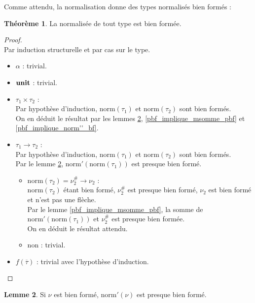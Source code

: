 \documentclass[a4paper]{report}
\newenvironment{preuve} 
	{\begin{proof}~\\} 
	{\end{proof}}
\theoremstyle{definition}
\newtheorem{theoreme}{Théorème}
\newtheorem{lemme}[theoreme]{Lemme}
\newcommand{\unit}{\bold{unit}}
\newcommand{\norm}{\mathrm{norm}}
\begin{document}
Comme attendu, la normalisation donne des types normalisés bien formés :

\begin{theoreme} \label{norm_bf}
	La normalisée de tout type est bien formée.
\end{theoreme}

\begin{preuve}
	Par induction structurelle et par cas sur le type.
	\begin{itemize}[label={\textbf{Cas}}]
		\item
			$\alpha$ : trivial.
		\item
			$\unit$ : trivial.
		\item
			$\tau_1 \times \tau_2$ : \\
			Par hypothèse d'induction, $\norm (\tau_1)$ et $\norm (\tau_2)$ sont bien formés. \\
			On en déduit le résultat par les lemmes \ref{bf_implique_norm'_pbf}, \ref{pbf_implique_msomme_pbf} et \ref{pbf_implique_norm''_bf}.
		\item
			$\tau_1 \rightarrow \tau_2$ : \\
			Par hypothèse d'induction, $\norm (\tau_1)$ et $\norm (\tau_2)$ sont bien formés. \\
			Par le lemme \ref{bf_implique_norm'_pbf}, $\norm' (\norm (\tau_1))$ est presque bien formé.
			\begin{itemize}[label={\textbf{Si}}]
				\item
					$\norm (\tau_2) = \nu^\#_2 \rightarrow \nu_2$ : \\
					$\norm (\tau_2)$ étant bien formé, $\nu^\#_2$ est presque bien formé, $\nu_2$ est bien formé et n'est pas une flèche. \\
					Par le lemme \ref{pbf_implique_msomme_pbf}, la somme de $\norm' (\norm (\tau_1))$ et $\nu^\#_2$ est presque bien formée. \\
					On en déduit le résultat attendu.
				\item
					non : trivial.
			\end{itemize}
		\item
			$f (\overline \tau)$ : trivial avec l'hypothèse d'induction.
	\end{itemize}
\end{preuve}

\begin{lemme} \label{bf_implique_norm'_pbf}
	Si $\nu$ est bien formé, $\norm' (\nu)$ est presque bien formé.
\end{lemme}
\end{document}
